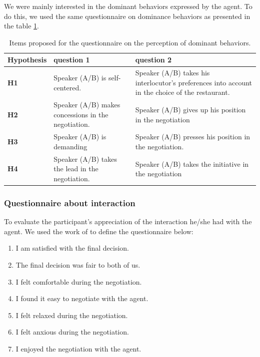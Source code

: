 \documentclass{llncs}
\begin{document}
We were mainly interested in the dominant behaviors expressed by the agent. To do this, we used the same questionnaire on dominance behaviors as presented in the table \ref{table:questionnaire}.
\begin{table}[H]
	\centering
	\begin{tabular}{|p{1.75cm}|p{4cm}|p{4.8cm}|}
		
		\hline
		Hypothesis &question 1& question 2 \\
		\hline
		\textbf{H1} &Speaker (A/B) is self-centered.&Speaker (A/B) takes his interlocutor's preferences into account in the choice of the restaurant.\\
		\hline
		\textbf{H2} &Speaker (A/B) makes concessions in the negotiation.&Speaker (A/B) gives up his position in the negotiation\\
		\hline
		\textbf{H3} & Speaker (A/B) is demanding&Speaker (A/B) presses his position in the negotiation. \\
		\hline
		\textbf{H4} &Speaker (A/B) takes the lead in the negotiation.&Speaker (A/B) takes the initiative in the negotiation \\
		\hline
	\end{tabular}
	
	\caption{Items proposed for the questionnaire on the perception of dominant behaviors.}
	\label{table:questionnaire}
\end{table}


\subsubsection{Questionnaire about interaction}
To evaluate the participant's appreciation of the interaction he/she had with the agent. We used the work of \cite{tiedens2003power,wiltermuth2009benefits,olekalns2013dyadic} to define the questionnaire below:

\begin{enumerate}
	\item I am satisfied with the final decision.
	\item The final decision was fair to both of us.
	\item I felt comfortable during the negotiation.
	\item I found it easy to negotiate with the agent.
	\item I felt relaxed during the negotiation.
	\item I felt anxious during the negotiation.
	\item I enjoyed the negotiation with the agent.
\end{enumerate}
\end{document}
